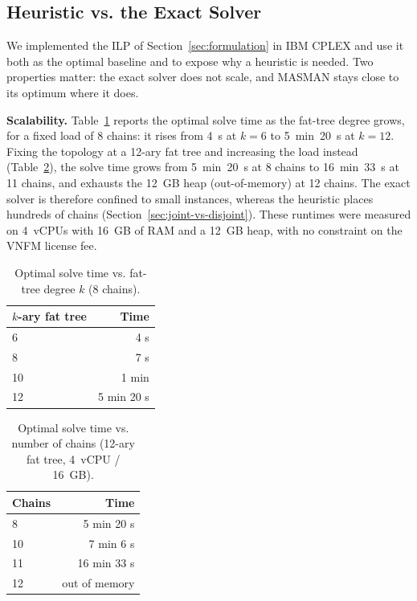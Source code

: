\subsection{Heuristic vs. the Exact Solver}\label{sec:heuristic-vs-optimal}

We implemented the ILP of Section~\ref{sec:formulation} in IBM CPLEX and use it
both as the optimal baseline and to expose why a heuristic is needed. Two
properties matter: the exact solver does not scale, and MASMAN stays close to its
optimum where it does.

\textbf{Scalability.} Table~\ref{tbl:exact-runtime-topology} reports the optimal
solve time as the fat-tree degree grows, for a fixed load of 8 chains: it rises
from 4~s at \(k = 6\) to 5~min~20~s at \(k = 12\). Fixing the topology at a
12-ary fat tree and increasing the load instead
(Table~\ref{tbl:exact-runtime-chains}), the solve time grows from 5~min~20~s at 8
chains to 16~min~33~s at 11 chains, and exhausts the 12~GB heap (out-of-memory) at
12 chains. The exact solver is therefore confined to small instances, whereas the
heuristic places hundreds of chains (Section~\ref{sec:joint-vs-disjoint}). These
runtimes were measured on 4~vCPUs with 16~GB of RAM and a 12~GB heap, with no
constraint on the VNFM license fee.

\begin{table}[H]
\caption{Optimal solve time vs. fat-tree degree \(k\) (8 chains).}
\label{tbl:exact-runtime-topology}
\begin{tabularx}{0.6\textwidth}{Xr}
\toprule
\textbf{\(k\)-ary fat tree} & \textbf{Time} \\
\midrule
6 & 4 s \\
8 & 7 s \\
10 & 1 min \\
12 & 5 min 20 s \\
\bottomrule
\end{tabularx}
\end{table}

\begin{table}[H]
\caption{Optimal solve time vs. number of chains (12-ary fat tree, 4~vCPU /
16~GB).}
\label{tbl:exact-runtime-chains}
\begin{tabularx}{0.6\textwidth}{Xr}
\toprule
\textbf{Chains} & \textbf{Time} \\
\midrule
8 & 5 min 20 s \\
10 & 7 min 6 s \\
11 & 16 min 33 s \\
12 & out of memory \\
\bottomrule
\end{tabularx}
\end{table}

